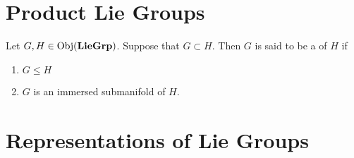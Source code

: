 \documentclass{book}
\begin{document}
\newpage
\section{Product Lie Groups}

\begin{defn}
	Let $G, H \in \operatorname{Obj}(\operatorname*{\text{\textbf{LieGrp}}})$. Suppose that $G \subset H$. Then $G$ is said to be a  of $H$ if 
	\begin{enumerate}
		\item $G \leqslant H$ 
		\item $G$ is an immersed submanifold of $H$. 
	\end{enumerate} 
\end{defn}











































\section{Representations of Lie Groups}
\end{document}
